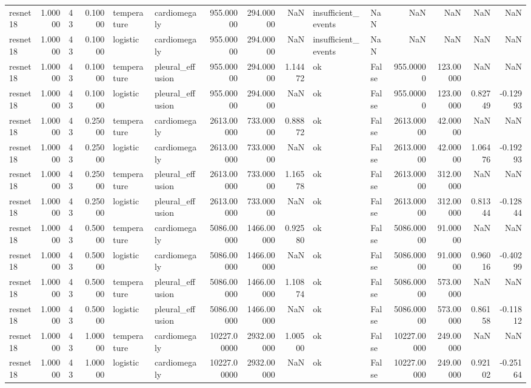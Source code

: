 \begin{tabular}{lrlrllrrrllrrrr}
resnet18 & 1.00000 & 43 & 0.10000 & temperature & cardiomegaly & 955.00000 & 294.00000 & NaN & insufficient\_events & NaN & NaN & NaN & NaN & NaN \\
resnet18 & 1.00000 & 43 & 0.10000 & logistic & cardiomegaly & 955.00000 & 294.00000 & NaN & insufficient\_events & NaN & NaN & NaN & NaN & NaN \\
resnet18 & 1.00000 & 43 & 0.10000 & temperature & pleural\_effusion & 955.00000 & 294.00000 & 1.14472 & ok & False & 955.00000 & 123.00000 & NaN & NaN \\
resnet18 & 1.00000 & 43 & 0.10000 & logistic & pleural\_effusion & 955.00000 & 294.00000 & NaN & ok & False & 955.00000 & 123.00000 & 0.82749 & -0.12993 \\
resnet18 & 1.00000 & 43 & 0.25000 & temperature & cardiomegaly & 2613.00000 & 733.00000 & 0.88872 & ok & False & 2613.00000 & 42.00000 & NaN & NaN \\
resnet18 & 1.00000 & 43 & 0.25000 & logistic & cardiomegaly & 2613.00000 & 733.00000 & NaN & ok & False & 2613.00000 & 42.00000 & 1.06476 & -0.19293 \\
resnet18 & 1.00000 & 43 & 0.25000 & temperature & pleural\_effusion & 2613.00000 & 733.00000 & 1.16578 & ok & False & 2613.00000 & 312.00000 & NaN & NaN \\
resnet18 & 1.00000 & 43 & 0.25000 & logistic & pleural\_effusion & 2613.00000 & 733.00000 & NaN & ok & False & 2613.00000 & 312.00000 & 0.81344 & -0.12844 \\
resnet18 & 1.00000 & 43 & 0.50000 & temperature & cardiomegaly & 5086.00000 & 1466.00000 & 0.92580 & ok & False & 5086.00000 & 91.00000 & NaN & NaN \\
resnet18 & 1.00000 & 43 & 0.50000 & logistic & cardiomegaly & 5086.00000 & 1466.00000 & NaN & ok & False & 5086.00000 & 91.00000 & 0.96016 & -0.40299 \\
resnet18 & 1.00000 & 43 & 0.50000 & temperature & pleural\_effusion & 5086.00000 & 1466.00000 & 1.10874 & ok & False & 5086.00000 & 573.00000 & NaN & NaN \\
resnet18 & 1.00000 & 43 & 0.50000 & logistic & pleural\_effusion & 5086.00000 & 1466.00000 & NaN & ok & False & 5086.00000 & 573.00000 & 0.86158 & -0.11812 \\
resnet18 & 1.00000 & 43 & 1.00000 & temperature & cardiomegaly & 10227.00000 & 2932.00000 & 1.00500 & ok & False & 10227.00000 & 249.00000 & NaN & NaN \\
resnet18 & 1.00000 & 43 & 1.00000 & logistic & cardiomegaly & 10227.00000 & 2932.00000 & NaN & ok & False & 10227.00000 & 249.00000 & 0.92102 & -0.25164 \\

\end{tabular}

